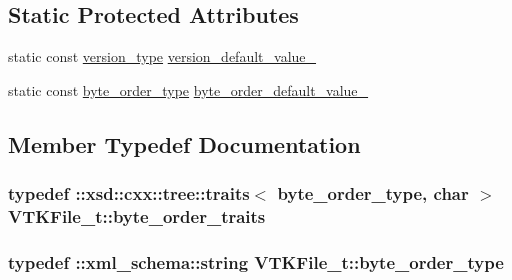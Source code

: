 \subsection*{Static Protected Attributes}
\begin{DoxyCompactItemize}
\item 
static const \hyperlink{classVTKFile__t_a7db6f6d11f363380d6361446f5dede7b}{version\+\_\+type} \hyperlink{classVTKFile__t_a014a015095591737663a8d8513aca931}{version\+\_\+default\+\_\+value\+\_\+}
\item 
static const \hyperlink{classVTKFile__t_ab08dd45c560dd0635d0e5c0a5e42d2e8}{byte\+\_\+order\+\_\+type} \hyperlink{classVTKFile__t_aa8272f99cd398033e3db5dbd752f3305}{byte\+\_\+order\+\_\+default\+\_\+value\+\_\+}
\end{DoxyCompactItemize}


\subsection{Member Typedef Documentation}
\subsubsection[{\texorpdfstring{byte\+\_\+order\+\_\+traits}{byte_order_traits}}]{\setlength{\rightskip}{0pt plus 5cm}typedef \+::xsd\+::cxx\+::tree\+::traits$<$ {\bf byte\+\_\+order\+\_\+type}, char $>$ {\bf V\+T\+K\+File\+\_\+t\+::byte\+\_\+order\+\_\+traits}}\hypertarget{classVTKFile__t_ae0b8c254bc373d9218ea9eab406b7b98}{}\label{classVTKFile__t_ae0b8c254bc373d9218ea9eab406b7b98}
\subsubsection[{\texorpdfstring{byte\+\_\+order\+\_\+type}{byte_order_type}}]{\setlength{\rightskip}{0pt plus 5cm}typedef \+::{\bf xml\+\_\+schema\+::string} {\bf V\+T\+K\+File\+\_\+t\+::byte\+\_\+order\+\_\+type}}\hypertarget{classVTKFile__t_ab08dd45c560dd0635d0e5c0a5e42d2e8}{}\label{classVTKFile__t_ab08dd45c560dd0635d0e5c0a5e42d2e8}
